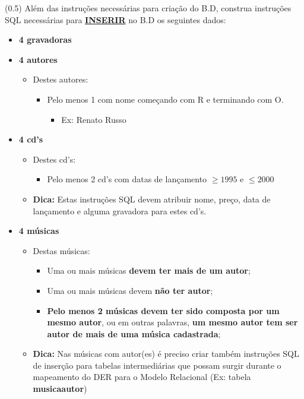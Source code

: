 \documentclass[12pt]{exam}
\begin{document}
\begin{questions}
\question (0.5) Além das instruções necessárias para criação do B.D, construa instruções SQL necessárias para \textbf{\underline{INSERIR}} no B.D os seguintes dados:

\begin{itemize}
    \item \textbf{4 gravadoras}
    \item \textbf{4 autores}
    \begin{itemize}
        \item Destes autores:
        \begin{itemize}
            \item Pelo menos 1 com nome começando com R e terminando com O. 
            \begin{itemize}
                \item Ex: Renato Russo
            \end{itemize}
        \end{itemize}
    \end{itemize}
    \item \textbf{4 cd's}
    \begin{itemize}
        \item Destes cd's:
        \begin{itemize}
            \item Pelo menos 2 cd's com datas de lançamento $\geq 1995$ e $\leq 2000$
        \end{itemize}
         \item \textbf{Dica:} Estas instruções SQL devem atribuir nome, preço, data de lançamento e alguma gravadora para estes cd's.
    \end{itemize}
    \item \textbf{4 músicas}
        \begin{itemize}
            \item Destas músicas:
            \begin{itemize}
                \item Uma ou mais músicas \textbf{devem ter mais de um autor};
                \item Uma ou mais músicas devem \textbf{não ter autor};
                \item \textbf{Pelo menos 2 músicas devem ter sido composta por um mesmo autor}, ou em outras palavras, \textbf{um mesmo autor tem ser autor de mais de uma música cadastrada};
            \end{itemize}
            \item \textbf{Dica:} Nas músicas com autor(es) é preciso criar também instruções SQL de inserção para tabelas intermediárias que possam surgir durante o mapeamento do DER para o Modelo Relacional (Ex: tabela \textbf{musica\underline{\hspace{0.3cm}}autor})
        \end{itemize}
\end{itemize}


\end{questions}
\end{document}
